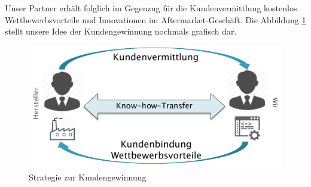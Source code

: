 Unser Partner erhält folglich im Gegenzug für die Kundenvermittlung kostenlos Wettbewerbsvorteile und Innovationen im Aftermarket-Geschäft. Die Abbildung \ref{fig:Kundengewinnung} stellt unsere Idee der Kundengewinnung nochmals grafisch dar.

\begin{figure}[H]
\centering
\includegraphics[width=0.7\linewidth]{Bilder/Kundengewinnung}
\caption{Strategie zur Kundengewinnung}
\label{fig:Kundengewinnung}
\end{figure}
